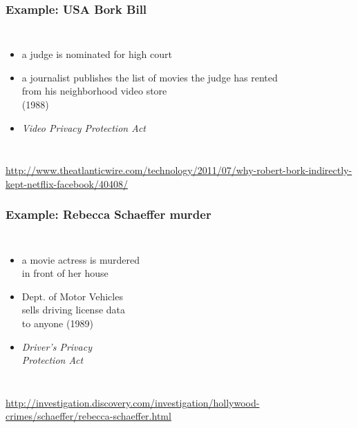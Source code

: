 \documentclass[dvipsnames]{beamer}
\theoremstyle{plain}
\begin{document}
\begin{frame}
  \frametitle{Example: USA Bork Bill}

  \begin{columns}

    \begin{itemize}
      \item a judge is nominated for high court
      \item a journalist publishes the list of
        movies the judge has rented\\
        from his neighborhood video store\\
        (1988)

      \medskip
      \item \emph{Video Privacy Protection Act}
    \end{itemize}
  \end{columns}

  \medskip
  \tiny{\url{http://www.theatlanticwire.com/technology/2011/07/why-robert-bork-indirectly-kept-netflix-facebook/40408/}}\\
\end{frame}

\begin{frame}
  \frametitle{Example: Rebecca Schaeffer murder}

  \begin{columns}

    \begin{itemize}
      \item a movie actress is murdered\\
        in front of her house
      \item Dept. of Motor Vehicles\\
        sells driving license data\\
        to anyone (1989)

      \medskip
      \item \emph{Driver's Privacy\\
        Protection Act}
    \end{itemize}
  \end{columns}

  \medskip
  \tiny{\url{http://investigation.discovery.com/investigation/hollywood-crimes/schaeffer/rebecca-schaeffer.html}}\\
\end{frame}
\end{document}
